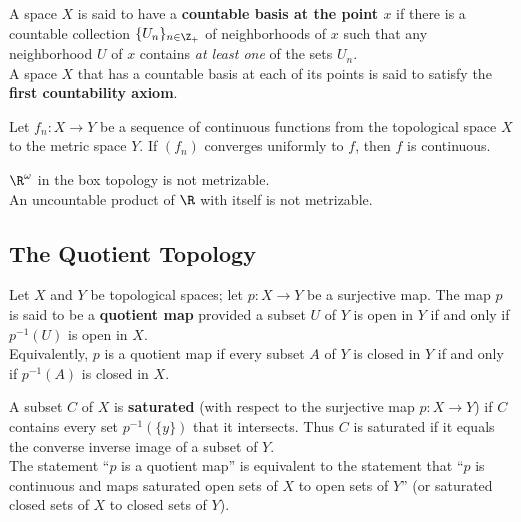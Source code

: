 \begin{definition}
A space $X$ is said to have a \textbf{countable basis at the point $x$} if there is a countable collection $\{ U_n \}_{n \in \Z_+}$ of neighborhoods of $x$
such that any neighborhood $U$ of $x$ contains \textit{at least one} of the sets $U_n$. \\

A space $X$ that has a countable basis at each of its points is said to satisfy the \textbf{first countability axiom}.
\end{definition}

\begin{theorem}
Let $f_n \colon X \rightarrow Y$ be a sequence of continuous functions from the topological space $X$ to the metric space $Y$. If $(f_n)$ converges uniformly to $f$, then
$f$ is continuous.
\end{theorem}

\begin{eg}
$\R^\omega$ in the box topology is not metrizable. \\

An uncountable product of $\R$ with itself is not metrizable.
\end{eg}

\subsection{The Quotient Topology}

\begin{definition}
Let $X$ and $Y$ be topological spaces; let $p \colon X \rightarrow Y$ be a surjective map. The map $p$ is said to be a \textbf{quotient map} 
provided a subset $U$ of $Y$ is open in $Y$ if and only if $p^{-1}(U)$ is open in $X$. \\

Equivalently, $p$ is a quotient map if every subset $A$ of $Y$ is closed in $Y$ if and only if $p^{-1}(A)$ is closed in $X$.
\end{definition}

\begin{definition}
A subset $C$ of $X$ is \textbf{saturated} (with respect to the surjective map $p\colon X \rightarrow Y$) if $C$ contains every set $p^{-1}(\{ y \})$ that it intersects.
Thus $C$ is saturated if it equals the converse inverse image of a subset of $Y$. \\

The statement ``$p$ is a quotient map'' is equivalent to the statement that ``$p$ is continuous and maps saturated open sets of $X$ to open sets of $Y$'' (or 
saturated closed sets of $X$ to closed sets of $Y$).
\end{definition}

